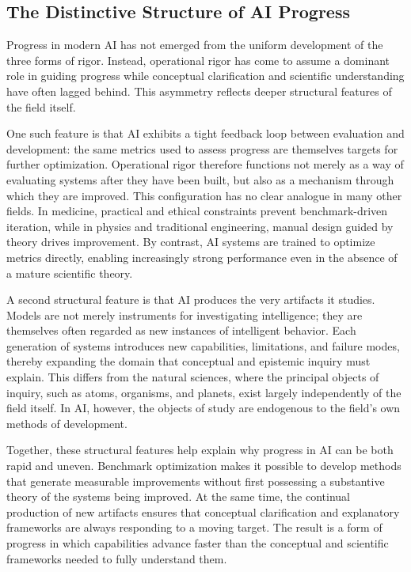 \documentclass{article}
\begin{document}
\subsection{The Distinctive Structure of AI Progress}

Progress in modern AI has not emerged from the uniform development of the three forms of rigor.
Instead, operational rigor has come to assume a dominant role in guiding progress while conceptual clarification and scientific understanding have often lagged behind.
This asymmetry reflects deeper structural features of the field itself.

One such feature is that AI exhibits a tight feedback loop between evaluation and development: the same metrics used to assess progress are themselves targets for further optimization.
Operational rigor therefore functions not merely as a way of evaluating systems after they have been built, but also as a mechanism through which they are improved.
This configuration has no clear analogue in many other fields.
In medicine, practical and ethical constraints prevent benchmark-driven iteration, while in physics and traditional engineering, manual design guided by theory drives improvement.
By contrast, AI systems are trained to optimize metrics directly, enabling increasingly strong performance even in the absence of a mature scientific theory.

A second structural feature is that AI produces the very artifacts it studies.
Models are not merely instruments for investigating intelligence; they are themselves often regarded as new instances of intelligent behavior.
Each generation of systems introduces new capabilities, limitations, and failure modes, thereby expanding the domain that conceptual and epistemic inquiry must explain.
This differs from the natural sciences, where the principal objects of inquiry, such as atoms, organisms, and planets, exist largely independently of the field itself.
In AI, however, the objects of study are endogenous to the field’s own methods of development.

Together, these structural features help explain why progress in AI can be both rapid and uneven.
Benchmark optimization makes it possible to develop methods that generate measurable improvements without first possessing a substantive theory of the systems being improved.
At the same time, the continual production of new artifacts ensures that conceptual clarification and explanatory frameworks are always responding to a moving target.
The result is a form of progress in which capabilities advance faster than the conceptual and scientific frameworks needed to fully understand them.
\end{document}
